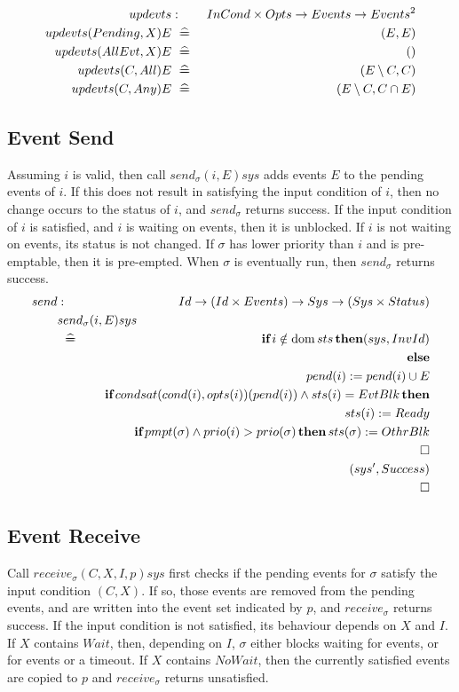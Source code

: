 \begin{eqnarray*}
   updevts &:& InCond \times Opts \fun Events \fun Events^2
\\ updevts(Pending,X)E &\defs& (E,E)
\\ updevts(AllEvt,X)E     &\defs& ()
\\ updevts(C,All)E &\defs& (E\setminus C,C)
\\ updevts(C,Any)E &\defs& (E\setminus C,C \cap E)
\end{eqnarray*}

\newpage
\subsection{Event Send}

Assuming $i$ is valid,
then call $send_\sigma(i,E)sys$ adds events $E$
to the pending events of $i$.
If this does not result in satisfying the input condition of $i$,
then no change occurs to the status of $i$,
and $send_\sigma$ returns success.
If the input condition of $i$ is satisfied,
and $i$ is waiting on events, then it is unblocked.
If $i$ is not waiting on events, its status is not changed.
If $\sigma$ has lower priority than $i$ and is pre-emptable,
then it is pre-empted.
When $\sigma$ is eventually run, then $send_\sigma$ returns success.
\begin{eqnarray*}
   send &:& Id \fun (Id \times Events) \fun Sys \fun (Sys \times Status)
\\ \lefteqn{send_\sigma(i,E)sys}
\\ &\defs&
      \IF i \notin \dom sts \THEN (sys,InvId)
\\ && \ELSE
\\ && \quad pend(i) := pend(i) \cup E
\\ && \quad \IF condsat(cond(i),opts(i))(pend(i)) \land sts(i) = EvtBlk \THEN
\\ && \qquad sts(i) := Ready
\\ && \qquad \IF pmpt(\sigma) \land prio(i)>prio(\sigma) \THEN sts(\sigma) := OthrBlk
\\ && \quad \Box
\\ && \quad (sys',Success)
\\ && \Box
\end{eqnarray*}

\newpage
\subsection{Event Receive}

Call $receive_\sigma(C,X,I,p)sys$ first checks if the
pending events for $\sigma$ satisfy the input condition $(C,X)$.
If so, those events are removed from the pending events,
and are written into the event set indicated by $p$,
and $receive_\sigma$ returns success.
If the input condition is not satisfied,
its behaviour depends on $X$ and $I$.
If $X$ contains $Wait$, then, depending on $I$,
$\sigma$ either blocks waiting for events,
or for events or a timeout.
If $X$ contains $NoWait$,
then the currently satisfied events are copied to $p$
and $receive_\sigma$ returns unsatisfied.


